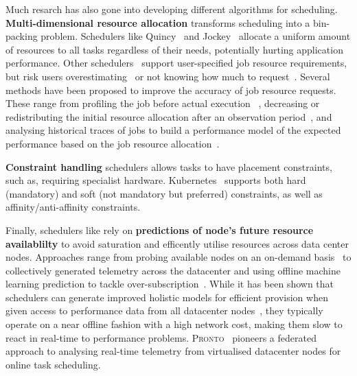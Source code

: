 Much resarch has also gone into developing different algorithms for
scheduling.\\
\textbf{Multi-dimensional resource allocation} transforms scheduling into a
bin-packing problem. Schedulers like Quincy~\cite{isard2009quincy} and Jockey~\cite{ferguson2012jockey}
allocate a uniform amount of resources to all tasks regardless of their needs,
potentially hurting application performance. Other schedulers~\cite{verma2015large, delimitrou2014quasar,
hindman2011mesos} support user-specified job resource requirements, but risk users
overestimating~\cite{gog2018flexible} or not knowing how much to request~\cite{mogul2015inferring}.
Several methods have been proposed to improve the accuracy of job resource
requests. These range from profiling the job before actual execution~\cite{delimitrou2014quasar}
, decreasing or redistributing the initial resource allocation after an
observation period~\cite{verma2015large,grandl2016altruistic}, and analysing historical traces of jobs to
build a performance model of the expected performance based on the job resource
    allocation~\cite{ferguson2012jockey, venkataraman2016ernest, peng2018optimus}.

\textbf{Constraint handling} schedulers allows tasks to have placement
constraints, such as, requiring specialist hardware. Kubernetes~\cite{kube-constraints}
supports both hard (mandatory) and soft (not mandatory but preferred)
constraints, as well as affinity/anti-affinity constraints.


Finally, schedulers like \cite{boutin2014apollo, karanasos2015mercury, verma2015large,
gog_firmament_2016, mao2019learning, ousterhout2013sparrow}
rely on \textbf{predictions of node's future resource
availablilty} to avoid saturation and efficently utilise resources across data
center nodes. Approaches range from probing available nodes on an on-demand
basis~\cite{ousterhout2013sparrow,verma2015large} to collectively
generated telemetry across the datacenter and using offline machine learning
prediction to tackle over-subscription~\cite{cortez2017resource}. While it has
been shown that schedulers can generate improved holistic models for efficient
provision when given access to performance data from all datacenter
nodes~\cite{verma2015large, gog_firmament_2016, boutin2014apollo,
mao2019learning, cortez2017resource}, they typically operate on a near offline
fashion with a high network cost, making them slow to react in real-time to
performance problems. \textsc{Pronto}~\cite{grammenos_pronto_2021} pioneers
a federated approach to analysing real-time telemetry from virtualised
datacenter nodes for online task scheduling.

